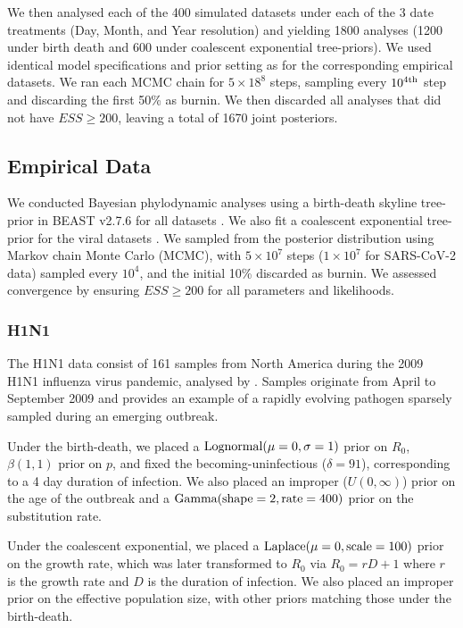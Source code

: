 \documentclass[11pt]{article}
\begin{document}
\begin{spacing}{1.5}
We then analysed each of the 400 simulated datasets under each of the 3 date treatments (Day, Month, and Year resolution) and yielding 1800 analyses (1200 under birth death and 600 under coalescent exponential tree-priors). We used identical model specifications and prior setting as for the corresponding empirical datasets. We ran each MCMC chain for $5\times18^{8}$ steps, sampling every $10^{4\textnormal{th}}$ step and discarding the first 50\% as burnin. We then discarded all analyses that did not have $ESS\geq200$, leaving a total of 1670 joint posteriors.

\subsection*{Empirical Data}
We conducted Bayesian phylodynamic analyses using a birth-death skyline tree-prior in BEAST v2.7.6 for all datasets \citep{bouckaert_beast_2019,stadler2012estimating}. We also fit a coalescent exponential tree-prior for the viral datasets \citep{kingman_1982_coalescent}. We sampled from the posterior distribution using Markov chain Monte Carlo (MCMC), with $5\times10^{7}$ steps ($1\times10^{7}$ for SARS-CoV-2 data) sampled every $10^{4}$, and the initial 10\% discarded as burnin. We assessed convergence by ensuring $ESS\geq200$ for all parameters and likelihoods.

\subsubsection*{H1N1}
The H1N1 data consist of 161 samples from North America during the 2009 H1N1 influenza virus pandemic, analysed by \citet{hedge_2013_real-time}. Samples originate from April to September 2009 and provides an example of a rapidly evolving pathogen sparsely sampled during an emerging outbreak. 

Under the birth-death, we placed a $\textnormal{Lognormal}(\mu=0,\sigma=1)$ prior on $R_0$, $\beta(1,1)$ prior on $p$, and fixed the becoming-uninfectious ($\delta = 91$), corresponding to a 4 day duration of infection. We also placed an improper ($U(0,\infty)$) prior on the age of the outbreak and a $\textnormal{Gamma}(\textnormal{shape}=2,\textnormal{rate}=400)$ prior on the substitution rate.

Under the coalescent exponential, we placed a $\textnormal{Laplace}(\mu=0,\textnormal{scale}=100)$ prior on the growth rate, which was later transformed to $R_0$ via $R_0 = rD+1$ where $r$ is the growth rate and $D$ is the duration of infection. We also placed an improper prior on the effective population size, with other priors matching those under the birth-death.


\end{spacing}
\end{document}
